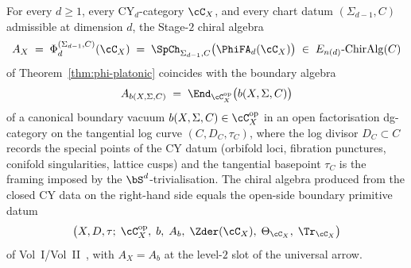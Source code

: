 \begin{conjecture}
\label{conj:chain-fusion}
\ClaimStatusConjectured
For every $d \geq 1$, every CY$_d$-category $\cC_X$, and every chart datum $(\Sigma_{d-1}, C)$ admissible at dimension $d$, the Stage-$2$ chiral algebra
\[
 A_X
 \;=\;
 \Phi_d^{(\Sigma_{d-1}, C)}(\cC_X)
 \;=\;
 \SpCh_{\Sigma_{d-1}, C}\bigl(\PhiFA_d(\cC_X)\bigr)
 \;\in\;
 E_{n(d)}\text{-}\mathrm{ChirAlg}(C)
\]
of Theorem~\ref{thm:phi-platonic} coincides with the boundary algebra
\[
 A_{b(X, \Sigma, C)}
 \;=\;
 \End_{\cC_X^{\mathrm{op}}}\bigl(b(X, \Sigma, C)\bigr)
\]
of a canonical boundary vacuum
$b(X, \Sigma, C) \in \cC_X^{\mathrm{op}}$ in an open factorisation
dg-category on the tangential log curve $(C, D_C, \tau_C)$, where the
log divisor $D_C \subset C$ records the special points of the CY datum
\textup{(}orbifold loci, fibration punctures, conifold singularities, lattice
cusps\textup{)} and the tangential basepoint $\tau_C$ is the framing
imposed by the $\bS^d$-trivialisation. The chiral algebra produced from
the closed CY data on the right-hand side equals the open-side
boundary primitive datum
\[
 \bigl(X, D, \tau;\;
 \cC_X^{\mathrm{op}},\;
 b,\;
 A_b,\;
 \Zder(\cC_X),\;
 \Theta_{\cC_X},\;
 \Tr_{\cC_X}\bigr)
\]
of Vol~I/Vol~II~\cite{VolI,VolII}, with $A_X = A_b$ at the level-$2$
slot of the universal arrow.
\end{conjecture}

